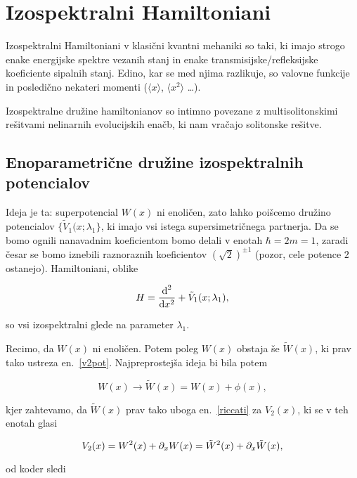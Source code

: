 \section{Izospektralni Hamiltoniani}

Izospektralni Hamiltoniani v klasi\v cni kvantni mehaniki so taki, ki imajo strogo enake energijske
spektre vezanih stanj in enake transmisijske/refleksijske koeficiente sipalnih stanj. Edino, kar se
med njima razlikuje, so valovne funkcije in posledi\v cno nekateri momenti ($\langle x \rangle$, $\langle
x^2 \rangle$ \ldots).

Izospektralne dru\v zine hamiltonianov so intimno povezane z multisolitonskimi re\v sitvami nelinarnih
evolucijskih ena\v cb, ki nam vra\v cajo solitonske re\v sitve.

\subsection{Enoparametri\v cne dru\v zine izospektralnih potencialov}

Ideja je ta: superpotencial $W(x)$ ni enoli\v cen, zato lahko poi\v scemo dru\v zino potencialov
$\{\tilde{V}_1(x;\lambda_1\}$, ki imajo vsi istega supersimetri\v cnega partnerja. Da se bomo ognili
nanavadnim koeficientom bomo delali v enotah $\hbar = 2m = 1$, zaradi \v cesar se bomo iznebili raznoraznih
koeficientov $(\sqrt{2})^{\pm 1}$ (pozor, cele potence $2$ ostanejo). Hamiltoniani, oblike

\begin{equation}
	H = \frac{\text{d}^2}{\text{d} x^2} + \tilde{V}_1 (x;\lambda_1),
\end{equation}

\ni so vsi izospektralni glede na parameter $\lambda_1$.

Recimo, da $W(x)$ ni enoli\v cen. Potem poleg $W(x)$ obstaja \v se $\tilde{W}(x)$, ki prav tako ustreza
en.~\eqref{v2pot}. Najpreprostej\v sa ideja bi bila potem

\begin{equation}
	W(x) \to \tilde{W}(x) = W(x) + \phi(x),
\end{equation}

\ni kjer zahtevamo, da $\tilde{W}(x)$ prav tako uboga en.~\eqref{riccati} za $V_2(x)$, ki se v teh enotah
glasi

\begin{equation}
	V_2 (x) = W^2(x) + \partial_x W(x) = \tilde{W}^2(x) + \partial_x\tilde{W}(x),
\end{equation}

\ni od koder sledi

